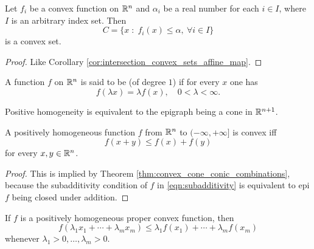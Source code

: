 \documentclass[11pt,a4paper]{article}
\begin{document}
\begin{corollary}\label{cor:intersection_convex_sets_convex_map}
    Let $f_i$ be a convex function on $\mathbb{R}^n$ and $\alpha_i$ be a real number for each $i\in I$, where $I$ is an arbitrary index set. Then
    \begin{equation*}
        C = \{x\;:\;f_i(x)\le \alpha,\ \forall i\in I\}
    \end{equation*}
    is a convex set.
\end{corollary}

\begin{proof}
    Like Corollary \ref{cor:intersection_convex_sets_affine_map}.
\end{proof}

\begin{definition}\label{def:postively_homogeneous}
    A function $f$ on $\mathbb{R}^n$ is said to be  (of degree $1$) if for every $x$ one has
    \begin{equation*}
        f(\lambda x) = \lambda f(x), \quad 0<\lambda<\infty.
    \end{equation*}
\end{definition}

\begin{remark}
    Positive homogeneity is equivalent to the epigraph being a cone in $\mathbb{R}^{n+1}$. 
\end{remark}

\begin{theorem}
    A positively homogeneous function $f$ from $\mathbb{R}^n$ to $(-\infty,+\infty]$ is convex iff
    \begin{equation}\label{eqn:subadditivity}
        f(x+y) \le f(x) + f(y)
    \end{equation}
    for every $x,y\in\mathbb{R}^n$.
\end{theorem}

\begin{proof}
    This is implied by Theorem \ref{thm:convex_cone_conic_combinations}, because the subadditivity condition of $f$ in \eqref{eqn:subadditivity} is equivalent to epi $f$ being closed under addition.
\end{proof}

\begin{corollary}
    If $f$ is a positively homogeneous proper convex function, then
    \begin{equation*}
        f(\lambda_1 x_1+\cdots+\lambda_m x_m) \le \lambda_1 f(x_1) + \cdots + \lambda_m f(x_m)
    \end{equation*}
    whenever $\lambda_1>0,\ldots,\lambda_m>0$.
\end{corollary}
\end{document}
